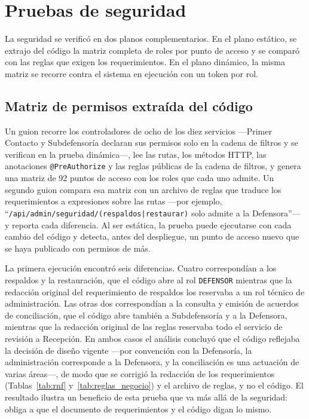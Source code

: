 	\section{Pruebas de seguridad}
	\label{sec:pruebas_seguridad}
	La seguridad se verificó en dos planos complementarios. En el plano estático, se extrajo del código la
	matriz completa de roles por punto de acceso y se comparó con las reglas que exigen los
	requerimientos. En el plano dinámico, la misma matriz se recorre contra el sistema en ejecución con un
	token por rol.

	\subsection{Matriz de permisos extraída del código}
	Un guion recorre los controladores de ocho de los diez servicios ---Primer Contacto y Subdefensoría
	declaran sus permisos solo en la cadena de filtros y se verifican en la prueba dinámica---, lee las rutas, los
	métodos HTTP, las anotaciones \texttt{@PreAuthorize} y las reglas públicas de la cadena de filtros, y
	genera una matriz de 92 puntos de acceso con los roles que cada uno admite. Un segundo guion compara
	esa matriz con un archivo de reglas que traduce los requerimientos a expresiones sobre las rutas ---por
	ejemplo, ``\texttt{/api/admin/seguridad/(respaldos|restaurar)} solo admite a la Defensora''--- y
	reporta cada diferencia. Al ser estática, la prueba puede ejecutarse con cada cambio del código y detecta, antes del
	despliegue, un punto de acceso nuevo que se haya publicado con permisos de más.

	La primera ejecución encontró seis diferencias. Cuatro correspondían a los respaldos y la
	restauración, que el código abre al rol \texttt{DEFENSOR} mientras que la redacción original del
	requerimiento de respaldos los reservaba a un rol técnico de administración. Las otras dos
	correspondían a la consulta y emisión de acuerdos de conciliación, que el código abre también a
	Subdefensoría y a la Defensora, mientras que la redacción original de las reglas reservaba todo el
	servicio de revisión a Recepción. En ambos casos el análisis concluyó que el código reflejaba la
	decisión de diseño vigente ---por convención con la Defensoría, la administración corresponde a la
	Defensora, y la conciliación es una actuación de varias áreas---, de modo que se corrigió la redacción de los requerimientos
	(Tablas~\ref{tab:rnf} y~\ref{tab:reglas_negocio}) y el archivo de reglas, y no el código. El
	resultado ilustra un beneficio de esta prueba que va más allá de la seguridad: obliga a que el
	documento de requerimientos y el código digan lo mismo.

